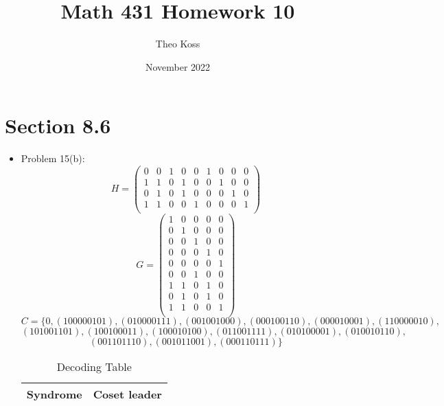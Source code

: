 \documentclass[a4paper,12pt]{extarticle}
\title{Math 431 Homework 10}
\author{Theo Koss}
\date{November 2022}
\theoremstyle{definition}
\begin{document}
\maketitle
\section{Section 8.6}
\begin{itemize}
    \item Problem 15(b): $$H = \begin{pmatrix}
    0 & 0 & 1 & 0 & 0 & 1 & 0 & 0 & 0\\
    1 & 1 & 0 & 1 & 0 & 0 & 1 & 0 & 0\\
    0 & 1 & 0 & 1 & 0 & 0 & 0 & 1 & 0\\
    1 & 1 & 0 & 0 & 1 & 0 & 0 & 0 & 1\\
    \end{pmatrix}$$ $$G = \begin{pmatrix}
    1 & 0 & 0 & 0 & 0 \\
    0 & 1 & 0 & 0 & 0 \\
    0 & 0 & 1 & 0 & 0 \\
    0 & 0 & 0 & 1 & 0 \\
    0 & 0 & 0 & 0 & 1 \\
    0 & 0 & 1 & 0 & 0 \\
    1 & 1 & 0 & 1 & 0 \\
    0 & 1 & 0 & 1 & 0 \\
    1 & 1 & 0 & 0 & 1 \\
    \end{pmatrix}$$ $$C = \{0, (100000101), (010000111), (001001000), (000100110), (000010001), (110000010),$$ $$ (101001101), (100100011), (100010100), (011001111), (010100001), (010010110),$$ $$(001101110), (001011001), (000110111)\}$$
    \begin{table}[h]
        \centering
        \begin{tabular}{c|c}
            Syndrome & Coset leader \\
            \hline
        \end{tabular}
        \caption{Decoding Table}
        \label{tab:my_label}
    \end{table}
\end{itemize}
\end{document}

